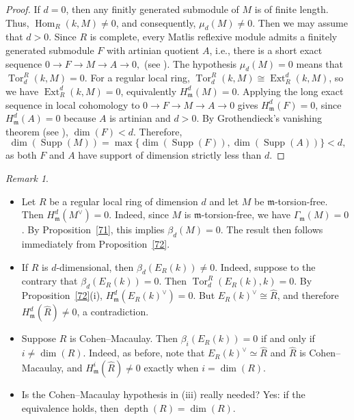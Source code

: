 \documentclass[11pt,a4paper]{amsart}
\numberwithin{equation}{section}
\theoremstyle{definition}
\theoremstyle{remark}
\newtheorem{remark}[theorem]{Remark}
\newcommand{\Hom}{\operatorname{Hom}}
\begin{document}
\begin{proof}If $d=0$, then any finitly generated submodule of $M$ is of finite length. Thus, $\Hom_R(k,M)\neq 0$, and consequently,  \(\mu_d(M)\neq0\). Then we may assume that $d>0$.
Since \(R\) is complete, every Matlis reflexive module admits a finitely generated submodule  $F$ with artinian quotient $A$, i.e., there is a short exact sequence
$0 \to F \to M \to A \to 0,$
(see \cite[page 92, Ex.~6]{en}). The hypothesis \(\mu_d(M)=0\) means that \(\operatorname{Tor}_d^R(k,M)=0\). For a regular local ring, \(\operatorname{Tor}_d^R(k,M)\cong \operatorname{Ext}^d_R(k,M)\), so we have \(\operatorname{Ext}^d_R(k,M)=0\), equivalently \(H^d_{\mathfrak{m}}(M)=0\). Applying the long exact sequence in local cohomology to \(0\to F\to M\to A\to 0\) gives \(H^d_{\mathfrak{m}}(F)=0\), since \(H^d_{\mathfrak{m}}(A)=0\) because \(A\) is artinian and \(d>0\). By Grothendieck's vanishing theorem (see \cite[6.1.2]{BSh}), \(\dim(F)<d\). Therefore,
\[\dim(\operatorname{Supp}(M)) = \max\{\dim(\operatorname{Supp}(F)), \dim(\operatorname{Supp}(A))\} < d,
\]
as both \(F\) and \(A\) have support of dimension strictly less than \(d\).
\end{proof}
	\fi



	
\begin{remark}
	\begin{itemize}
		\item[(i)] Let \(R\) be a regular local ring of dimension \(d\) and let \(M\) be \(\mathfrak{m}\)-torsion-free. Then \(H^d_{\mathfrak{m}}(M^\vee) = 0\). Indeed, since \(M\) is \(\mathfrak{m}\)-torsion-free, we have \(\Gamma_{\mathfrak{m}}(M) = 0\). By Proposition~\ref{71}, this implies \(\beta_d(M) = 0\). The result then follows immediately from Proposition~\ref{72}.
		
		\item[(ii)] If \(R\) is \(d\)-dimensional, then \(\beta_d(E_R(k)) \neq 0\). Indeed, suppose to the contrary that \(\beta_d(E_R(k)) = 0\). Then \(\operatorname{Tor}_d^R(E_R(k), k) = 0\). By Proposition~\ref{72}(i), \(H^d_{\mathfrak{m}}(E_R(k)^\vee) = 0\). But \(E_R(k)^\vee \cong \widehat{R}\), and therefore \(H^d_{\mathfrak{m}}(\widehat{R}) \neq 0\), a contradiction.
		
		\item[(iii)] Suppose \(R\) is Cohen--Macaulay. Then \(\beta_i(E_R(k)) = 0\) if and only if \(i \neq \dim(R)\). Indeed, as before, note that \(E_R(k)^\vee \simeq \widehat{R}\) and \(\widehat{R}\) is Cohen--Macaulay, and \(H^i_{\mathfrak{m}}(\widehat{R}) \neq 0\) exactly when \(i = \dim(R)\).
		
		\item[(iv)] Is the Cohen--Macaulay hypothesis in (iii) really needed? Yes: if the equivalence holds, then \(\operatorname{depth}(R) = \dim(R)\).
	\end{itemize}
\end{remark}
\end{document}
